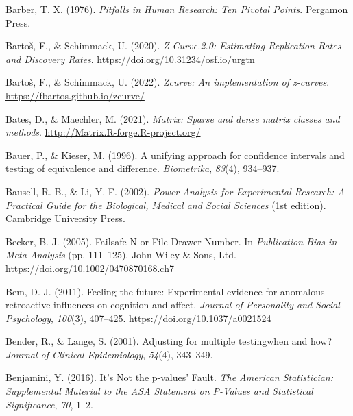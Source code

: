 \documentclass[
  oneside]{krantz}
\newlength{\cslhangindent}
\newlength{\cslentryspacingunit} %
\newenvironment{CSLReferences}[2] %
 {%
  \setlength{\parindent}{0pt}
  \ifodd #1
  \let\oldpar\par
  \def\par{\hangindent=\cslhangindent\oldpar}
  \fi
  \setlength{\parskip}{#2\cslentryspacingunit}
 }%
 {}
\begin{document}
\begin{CSLReferences}{1}{0}
\leavevmode{}%
Barber, T. X. (1976). \emph{Pitfalls in {Human Research}: {Ten Pivotal
Points}}. {Pergamon Press}.

\leavevmode{}%
Bartoš, F., \& Schimmack, U. (2020). \emph{Z-{Curve}.2.0: {Estimating
Replication Rates} and {Discovery Rates}}.
\url{https://doi.org/10.31234/osf.io/urgtn}

\leavevmode{}%
Bartoš, F., \& Schimmack, U. (2022). \emph{Zcurve: An implementation of
z-curves}. \url{https://fbartos.github.io/zcurve/}

\leavevmode{}%
Bates, D., \& Maechler, M. (2021). \emph{Matrix: Sparse and dense matrix
classes and methods}. \url{http://Matrix.R-forge.R-project.org/}

\leavevmode{}%
Bauer, P., \& Kieser, M. (1996). A unifying approach for confidence
intervals and testing of equivalence and difference. \emph{Biometrika},
\emph{83}(4), 934--937.

\leavevmode{}%
Bausell, R. B., \& Li, Y.-F. (2002). \emph{Power {Analysis} for
{Experimental Research}: {A Practical Guide} for the {Biological},
{Medical} and {Social Sciences}} (1st edition). {Cambridge University
Press}.

\leavevmode{}%
Becker, B. J. (2005). Failsafe {N} or {File-Drawer Number}. In
\emph{Publication {Bias} in {Meta-Analysis}} (pp. 111--125). {John Wiley
\& Sons, Ltd}. \url{https://doi.org/10.1002/0470870168.ch7}

\leavevmode{}%
Bem, D. J. (2011). Feeling the future: Experimental evidence for
anomalous retroactive influences on cognition and affect. \emph{Journal
of Personality and Social Psychology}, \emph{100}(3), 407--425.
\url{https://doi.org/10.1037/a0021524}

\leavevmode{}%
Bender, R., \& Lange, S. (2001). Adjusting for multiple
testing\textemdash when and how? \emph{Journal of Clinical
Epidemiology}, \emph{54}(4), 343--349.

\leavevmode{}%
Benjamini, Y. (2016). It's {Not} the p-values' {Fault}. \emph{The
American Statistician: Supplemental Material to the ASA Statement on
P-Values and Statistical Significance}, \emph{70}, 1--2.


\end{CSLReferences}
\end{document}
